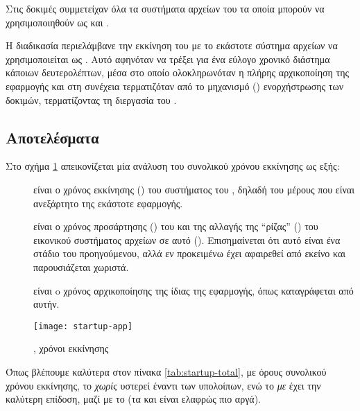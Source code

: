 Στις δοκιμές συμμετείχαν όλα τα συστήματα αρχείων του \osv{} τα οποία μπορούν να
χρησιμοποιηθούν ως  και \viofs{}.

Η διαδικασία περιελάμβανε την εκκίνηση του \osv{} με το εκάστοτε σύστημα αρχείων
να χρησιμοποιείται ως . Αυτό αφηνόταν να τρέξει για ένα
εύλογο χρονικό διάστημα κάποιων δευτερολέπτων, μέσα στο οποίο ολοκληρωνόταν η
πλήρης αρχικοποίηση της εφαρμογής και στη συνέχεια τερματιζόταν από το μηχανισμό
() ενορχήστρωσης των δοκιμών, τερματίζοντας τη διεργασία του \qemu{}.

\subsection{Αποτελέσματα}
Στο σχήμα \ref{fig:startup-app} απεικονίζεται μία ανάλυση του συνολικού χρόνου
εκκίνησης ως εξής:
\begin{description}
    \item[] είναι ο χρόνος εκκίνησης () του συστήματος του
                         \osv{}, δηλαδή του μέρους που είναι ανεξάρτητο της
                         εκάστοτε εφαρμογής.
    \item[] είναι ο χρόνος προσάρτησης () του
                               και της αλλαγής της
                              ``ρίζας'' (\en{/}) του εικονικού συστήματος
                              αρχείων σε αυτό (). Επισημαίνεται ότι
                              αυτό είναι ένα στάδιο του προηγούμενου, αλλά εν
                              προκειμένω έχει αφαιρεθεί από εκείνο και
                              παρουσιάζεται χωριστά.
    \item[] είναι o χρόνος αρχικοποίησης της ίδιας της
                            εφαρμογής, όπως καταγράφεται από αυτήν.
\end{description}

\begin{figure}
    \texttt{[image: startup-app]}
    \caption{, χρόνοι εκκίνησης}
    \label{fig:startup-app}
\end{figure}


Όπως βλέπουμε καλύτερα στον πίνακα \ref{tab:startup-total}, με όρους συνολικού
χρόνου εκκίνησης, το \viofs{} \emph{χωρίς}  υστερεί έναντι των
υπολοίπων, ενώ το \viofs{} \emph{με}  έχει την καλύτερη επίδοση,
μαζί με το  (τα  και  είναι ελαφρώς πιο αργά).

